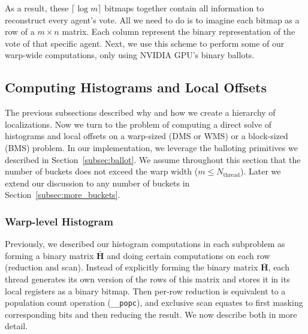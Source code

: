 As a result, these $\lceil \log m \rceil$ bitmaps together contain all information to reconstruct every agent's vote. All we need to do is to imagine each bitmap as a row of a $m\times n$ matrix.
Each column represent the binary representation of the vote of that specific agent. 
Next, we use this scheme to perform some of our warp-wide computations, only using NVIDIA GPU's binary ballots.
\subsection{Computing Histograms and Local Offsets}\label{subsec:histogram}
The previous subsections described why and how we create a hierarchy of localizations. Now we turn to the problem of computing a direct solve of histograms and local offsets on a warp-sized (DMS or WMS) or a block-sized (BMS) problem. In our implementation, we leverage the balloting primitives we described in Section~\ref{subsec:ballot}.
We assume throughout this section that the number of buckets does not exceed the warp width ($m \leq N_\text{thread}$). Later we extend our discussion to any number of buckets in Section~\ref{subsec:more_buckets}.

\subsubsection{Warp-level Histogram}\label{subsubsec:warp_histogram}
Previously, we described our histogram computations in each subproblem as forming a binary matrix $\bar{\mathbf{H}}$ and doing certain computations on each row (reduction and scan).
Instead of explicitly forming the binary matrix $\bar{\mathbf{H}}$, each thread generates its own version of the rows of this matrix and stores it in its local registers as a binary bitmap. Then per-row reduction is equivalent to a population count operation (\texttt{\_\_popc}), and exclusive scan equates to first masking corresponding bits and then reducing the result. We now describe both in more detail.

